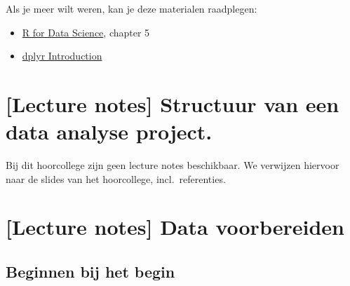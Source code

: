 \documentclass[]{tufte-book}
\providecommand{\tightlist}{%
  \setlength{\itemsep}{0pt}\setlength{\parskip}{0pt}}
\begin{document}
Als je meer wilt weren, kan je deze materialen raadplegen:

\begin{itemize}
\tightlist
\item
  \href{http://r4ds.had.co.nz/}{R for Data Science}, chapter 5
\item
  \href{https://cran.rstudio.com/web/packages/dplyr/vignettes/dplyr.html}{dplyr Introduction}
\end{itemize}

\hypertarget{lecture-notes-structuur-van-een-data-analyse-project.}{%
\chapter{{[}Lecture notes{]} Structuur van een data analyse project.}\label{lecture-notes-structuur-van-een-data-analyse-project.}}

Bij dit hoorcollege zijn geen lecture notes beschikbaar. We verwijzen hiervoor naar de slides van het hoorcollege, incl.~referenties.

\hypertarget{lecture-notes-data-voorbereiden}{%
\chapter{{[}Lecture notes{]} Data voorbereiden}\label{lecture-notes-data-voorbereiden}}

\hypertarget{beginnen-bij-het-begin}{%
\section{Beginnen bij het begin}\label{beginnen-bij-het-begin}}
\end{document}
